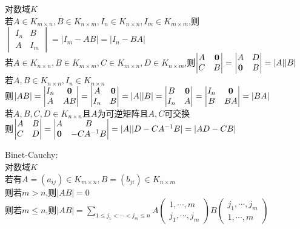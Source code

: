\begin{dingli}
对数域$K$\\
若$A\in K_{m\times n},B\in K_{n\times m},I_n\in K_{n\times n},I_m\in K_{m\times m}$,则$\begin{vmatrix}I_n&B\\ A&I_m\end{vmatrix}=|I_m-AB|=|I_n-BA|$\\
若$A\in K_{n\times n},B\in K_{m\times m},C\in K_{m\times n},D\in K_{n\times m}$,则$\begin{vmatrix}A&{\bf0}\\ C&B\end{vmatrix}=\begin{vmatrix}A&D\\ {\bf0}&B\end{vmatrix}=|A||B|$\\
若$A,B\in K_{n\times n},I_n\in K_{n\times n}$\\
则$|AB|=\begin{vmatrix}I_n&{\bf0}\\ A&AB\end{vmatrix}=\begin{vmatrix}A&{\bf0}\\ I_n&B\end{vmatrix}=|A||B|=\begin{vmatrix}B&{\bf0}\\ I_n&A\end{vmatrix}=\begin{vmatrix}I_n&{\bf0}\\ B&BA\end{vmatrix}=|BA|$\\
若$A,B,C,D\in K_{n\times n}$且$A$为可逆矩阵且$A,C$可交换\\
则$\begin{vmatrix}A&B\\ C&D\end{vmatrix}=\begin{vmatrix}A&B\\ {\bf0}&-CA^{-1}B\end{vmatrix}=|A||D-CA^{-1}B|=|AD-CB|$
\end{dingli}

\begin{dingli}
Binet-Cauchy:\\
对数域$K$\\
若有$A=(a_{ij})\in K_{m\times n},B=(b_{ji})\in K_{n\times m}$\\
则若$m>n$,则$|AB|=0$\\
则若$m\leq n$,则$|AB|=\sum\limits_{1\leq j_1<\cdots<j_{m}\leq n}A\begin{pmatrix}1,\cdots,m\\ j_1,\cdots,j_{m}\end{pmatrix}B\begin{pmatrix} j_1,\cdots,j_{m}\\1,\cdots,m\end{pmatrix}$
\end{dingli}

